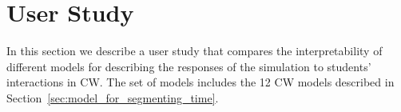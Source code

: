 \documentclass[letterpaper]{article} %
\begin{document}



\section{User Study} 
\label{sec:interpretability_results}



In this section we describe a user study that compares the interpretability of different models for describing the responses of the simulation to students' interactions in CW. 
The set of models includes the 12 CW models described in Section~\ref{sec:model_for_segmenting_time}.%


\end{document}
